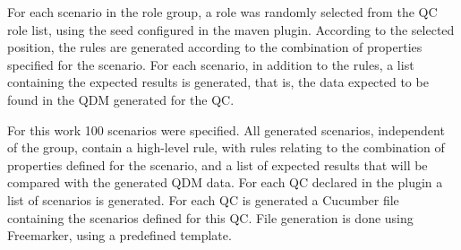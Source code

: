 \documentclass[AMA,STIX1COL]{WileyNJD-v2}
\begin{document}

For each scenario in the role group, a role was randomly selected from the QC role list, using the seed configured in the maven plugin. According to the selected position, the rules are generated according to the combination of properties specified for the scenario. For each scenario, in addition to the rules, a list containing the expected results is generated, that is, the data expected to be found in the QDM generated for the QC.


For this work 100 scenarios were specified. All generated scenarios, independent of the group, contain a high-level rule, with rules relating to the combination of properties defined for the scenario, and a list of expected results that will be compared with the generated QDM data. For each QC declared in the plugin a list of scenarios is generated. For each QC is generated a Cucumber file containing the scenarios defined for this QC. File generation is done using Freemarker, using a predefined template.

\end{document}
